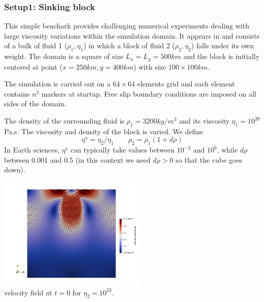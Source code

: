

\subsubsection*{Setup1: Sinking block} 

This simple benchark provides challenging numerical experiments dealing with large viscosity variations 
within the simulation domain. It appears in \cite{gery10,thie11} 
and consists of a bulk of fluid 1 ($\rho_1,\eta_1$)
in which a block of fluid 2 ($\rho_2,\eta_2$) falls under its own weight.
The domain is a square of size $L_x=L_y=500km$ and the block is initially centered at point ($x=250km,y=400km$) with size $100\times100km$. 

The simulation is carried out on a $64\times64$ elements grid and each element contains $n^3$ markers
at startup. Free slip boundary conditions are imposed on all sides of the domain. 

The density of the surrounding fluid is $\rho_1=3200kg/m^3$
and its viscosity $\eta_1=10^{20}$ Pa.s.
The viscosity and density of the block is varied. We define
\[
\eta^\star=\eta_2/\eta_1
\quad\quad
\rho_2=\rho_1 (1 + d\rho)
\]
In Earth sciences, $\eta^\star$ can typically take values between $10^{-2}$ and $10^6$,
while $d\rho$ between 0.001 and 0.5 (in this context we need $d\rho>0$ so that the cube 
goes down).

\begin{center}
\includegraphics[width=7cm]{python_codes/fieldstone_67/sinking/vel0}\\
{\captionfont velocity field at $t=0$ for $\eta_2=10^{23}$.}
\end{center}

